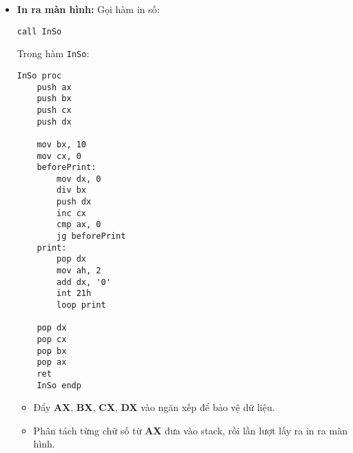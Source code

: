 \begin{itemize}
    \item \textbf{In ra màn hình:}
    Gọi hàm in số:
    \begin{lstlisting}[style=asm]
    call InSo 
    \end{lstlisting}
    Trong hàm \texttt{InSo}:
    \begin{lstlisting}[style=asm]
    InSo proc                 
    push ax
    push bx
    push cx
    push dx
    
    mov bx, 10             
    mov cx, 0
    beforePrint:
        mov dx, 0
        div bx            
        push dx           
        inc cx          
        cmp ax, 0          
        jg beforePrint
    print:
        pop dx      
        mov ah, 2          
        add dx, '0'      
        int 21h      
        loop print       
    
    pop dx
    pop cx
    pop bx
    pop ax
    ret
    InSo endp
    \end{lstlisting}
    \begin{itemize}
        \item Đẩy \textbf{AX}, \textbf{BX}, \textbf{CX}, \textbf{DX} vào ngăn xếp để bảo vệ dữ liệu.
        \item Phân tách từng chữ số từ \textbf{AX} đưa vào stack, rồi lần lượt lấy ra in ra màn hình.
    \end{itemize}
\end{itemize}